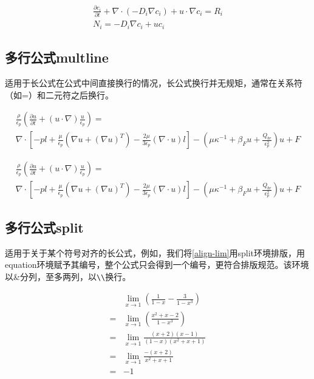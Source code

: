 \begin{gather}
\frac{\partial c_i}{\partial t}+\nabla \cdot (-D_{i} \nabla c_{i})+u \cdot \nabla c_{i}=R_i \\
N_{i}=-D_{i}\nabla c_{i}+uc_{i}
\end{gather}

\subsection{多行公式multline}

适用于长公式在公式中间直接换行的情况，长公式换行并无规矩，通常在关系符（如=）和二元符之后换行。

\begin{latex}
\begin{multline}
\frac{\rho}{\epsilon_p} \left(\frac{\partial u}{\partial t}+(u \cdot \nabla)\frac{u}{\epsilon_p}\right)=\\
\nabla \cdot \left[ -pl+\frac{\mu}{\epsilon_p}\left( \nabla u+(\nabla u)^T\right)-\frac{2\mu}{3\epsilon_p}(\nabla \cdot u)l\right]-\left( \mu \kappa^{-1} + \beta_{F}u+ \frac{Q_{br}}{\epsilon^{2}_{p}} \right)u+F
\end{multline}
\end{latex}

\begin{multline}
\frac{\rho}{\epsilon_p} \left(\frac{\partial u}{\partial t}+(u \cdot \nabla)\frac{u}{\epsilon_p}\right)=\\
\nabla \cdot \left[ -pl+\frac{\mu}{\epsilon_p}\left( \nabla u+(\nabla u)^T\right)-\frac{2\mu}{3\epsilon_p}(\nabla \cdot u)l\right]-\left( \mu \kappa^{-1} + \beta_{F}u+ \frac{Q_{br}}{\epsilon^{2}_{p}} \right)u+F
\end{multline}

\subsection{多行公式split}

适用于关于某个符号对齐的长公式，例如，我们将\autoref{align-lim}用split环境排版，用equation环境赋予其编号，整个公式只会得到一个编号，更符合排版规范。该环境以\&分列，至多两列，以\lstinline|\\|换行。


\begin{latex}
\begin{equation}
\begin{split}
&\lim\limits_{x\to 1}\left(\frac{1}{1-x}-\frac{3}{1-x^3}\right)\\
= &\lim\limits_{x\to 1}\left(\frac{x^2+x-2}{1-x^3}\right)  \\
= & \lim\limits_{x\to 1}\frac{(x+2)(x-1)}{(1-x)(x^2+x+1)}\\
= & \lim\limits_{x\to 1}\frac{-(x+2)}{x^2+x+1}\\
= & -1
\end{split}
\end{equation}
\end{latex}

